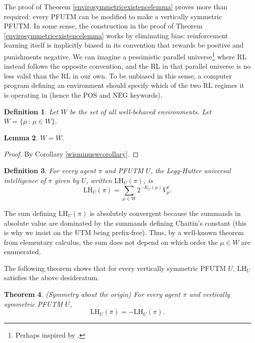 \documentclass{article}
\newtheorem{theorem}{Theorem}
\newtheorem{definition}[theorem]{Definition}
\newtheorem{lemma}[theorem]{Lemma}
\def\LH{\textrm{LH}}
\begin{document}
The proof of Theorem \ref{envirosymmetricexistencelemma} proves more than required:
every PFUTM can be modified to make a vertically symmetric PFUTM. In some sense,
the construction in the proof of Theorem \ref{envirosymmetricexistencelemma} works
by eliminating bias: reinforcement learning itself is implicitly biased in its
convention that rewards be positive and punishments negative. We can imagine
a pessimistic parallel universe\footnote{Perhaps inspired by \cite{foucault2012discipline}.}
where RL instead follows the opposite convention, and the
RL in that parallel universe is no less valid than the RL in our own. To be
unbiased in this sense, a computer program defining an environment
should specify which of the two RL regimes it is operating in (hence the
$\mathrm{POS}$ and $\mathrm{NEG}$ keywords).

\begin{definition}
    Let $W$ be the set of all well-behaved environments.
    Let $\overline W=\{\overline\mu\,:\,\mu\in W\}$.
\end{definition}

\begin{lemma}
\label{WequalsminusWlemma}
$W=\overline W$.
\end{lemma}

\begin{proof}
    By Corollary \ref{wisminuswcorollary}.
\end{proof}

\begin{definition}
\label{universalintelligencedefn}
For every agent $\pi$
and PFUTM $U$, the \emph{Legg-Hutter universal intelligence of $\pi$ given
by $U$}, written $\LH_U(\pi)$, is
\[
    \LH_U(\pi) = \sum_{\mu \in W} 2^{-K_U(\mu)}V^\pi_\mu.
\]
\end{definition}

The sum defining $\LH_U(\pi)$ is absolutely convergent because the summands
in absolute value are dominated by the summands defining Chaitin's constant
(this is why we insist on the UTM being prefix-free).
Thus, by a well-known
theorem from elementary calculus, the sum does not depend on which order the $\mu\in W$
are enumerated.

The following theorem shows that for every vertically symmetric PFUTM $U$, $\LH_U$
satisfies the above desideratum.

\begin{theorem}
\label{maintheorem}
(Symmetry about the origin)
    For every agent $\pi$ and vertically symmetric PFUTM $U$,
    \[
        \LH_U(\overline\pi) = -\LH_U(\pi).
    \]
\end{theorem}
\end{document}

